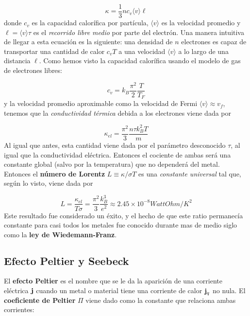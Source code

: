 \begin{equation}
	\kappa = \frac{1}{3} n c_v \langle v \rangle  \ell
\end{equation}
donde $c_v$ es la capacidad calorífica por partícula, $\langle v \rangle $ es la velocidad promedio y $\ell = \langle v \rangle \tau$ es el \textit{recorrido libre medio} por parte del electrón. Una manera intuitiva de llegar a esta ecuación es la siguiente: una densidad de $n$ electrones es capaz  de transportar una cantidad de calor $c_v T$ a una velocidad $\langle v \rangle $ a lo largo de una distancia $\ell$. Como hemos visto la capacidad calorífica usando el modelo de gas de electrones libres:

\begin{equation*}
	c_v = k_B  \frac{\pi^2}{2}  \frac{ T}{T_F} 
\end{equation*}
y la velocidad promedio aproximable como la velocidad de Fermi $\langle v \rangle \approx v_f$, tenemos que la \textit{conductividad térmica} debida a los electrones viene dada por

\begin{equation}
	\kappa_{el} = \frac{\pi^2}{3} \frac{n \tau k_B^2 T}{m}
\end{equation}
Al igual que antes, esta cantidad viene dada por el parámetro desconocido $\tau$, al igual que la conductividad eléctrica. Entonces el cociente de ambas será una constante global (salvo por la temperatura) que no dependerá del metal. Entonces el \textbf{número de Lorentz} $L\equiv \kappa/\sigma T$ es una \textit{constante universal} tal que, según lo visto, viene dada por

\begin{equation}
	L = \frac{\kappa_{el}}{T \sigma} = \frac{\pi^2}{3} \frac{k_B^3}{e^2} \approx 2.45 \times 10^{-8} \unit{WattOhm/K^2}
\end{equation}
Este resultado fue considerado un éxito, y el hecho de que este ratio permanecía constante para casi todos los metales fue conocido durante mas de medio siglo como la \textbf{ley de Wiedemann-Franz}. 

\subsection{Efecto Peltier y Seebeck}

El \textbf{efecto Peltier} es el nombre que se le da la aparición de una corriente eléctrica $\mathbf{j}$ cuando un metal o material tiene una corriente de calor $\mathbf{j}_q$ no nula. El \textbf{coeficiente de Peltier} $\Pi$ viene dado como la constante que relaciona ambas corrientes:

